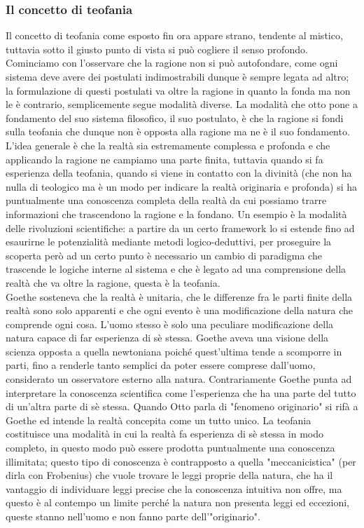 \documentclass[10pt,a4paper]{article}
\begin{document}
\subsubsection{Il concetto di teofania}
Il concetto di teofania come esposto fin ora appare strano, tendente al mistico, tuttavia sotto il giusto punto di vista si può cogliere il senso profondo. Cominciamo con l'osservare che la ragione non si può autofondare, come ogni sistema deve avere dei postulati indimostrabili dunque è sempre legata ad altro; la formulazione di questi postulati va oltre la ragione in quanto la fonda ma non le è contrario, semplicemente segue modalità diverse. La modalità che otto pone a fondamento del suo sistema filosofico, il suo postulato, è che la ragione si fondi sulla teofania che dunque non è opposta alla ragione ma ne è il suo fondamento. L'idea generale è che la realtà sia estremamente complessa e profonda e che applicando la ragione ne campiamo una parte finita, tuttavia quando si fa esperienza della teofania, quando si viene in contatto con la divinità (che non ha nulla di teologico ma è un modo per indicare la realtà originaria e profonda) si ha puntualmente una conoscenza completa della realtà da cui possiamo trarre informazioni che trascendono la ragione e la fondano. Un esempio è la modalità delle rivoluzioni scientifiche: a partire da un certo framework lo si estende fino ad esaurirne le potenzialità mediante metodi logico-deduttivi, per proseguire la scoperta però ad un certo punto è necessario un cambio di paradigma che trascende le logiche interne al sistema e che è legato ad una comprensione della realtà che va oltre la ragione, questa è la teofania.\\
Goethe sosteneva che la realtà è unitaria, che le differenze fra le parti finite della realtà sono solo apparenti e che ogni evento è una modificazione della natura che comprende ogni cosa. L'uomo stesso è solo una peculiare modificazione della natura capace di far esperienza di sè stessa. Goethe aveva una visione della scienza opposta a quella newtoniana poiché quest'ultima tende a scomporre in parti, fino a renderle tanto semplici da poter essere comprese dall'uomo, considerato un osservatore esterno alla natura. Contrariamente Goethe punta ad interpretare la conoscenza scientifica come l'esperienza che ha una parte del tutto di un'altra parte di sè stessa. Quando Otto parla di "fenomeno originario" si rifà a Goethe ed intende la realtà concepita come un tutto unico. La teofania costituisce una modalità in cui la realtà fa esperienza di sè stessa in modo completo, in questo modo può essere prodotta puntualmente una conoscenza illimitata; questo tipo di conoscenza è contrapposto a quella "meccanicistica" (per dirla con Frobenius) che vuole trovare le leggi proprie della natura, che ha il vantaggio di individuare leggi precise che la conoscenza intuitiva non offre, ma questo è al contempo un limite perché la natura non presenta leggi ed eccezioni, queste stanno nell'uomo e non fanno parte dell'"originario".\\
\end{document}
